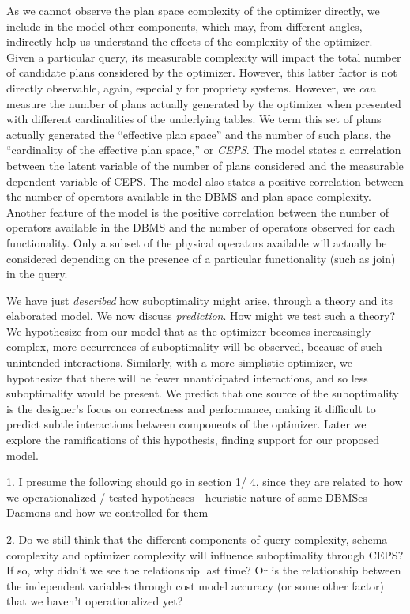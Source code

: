As we cannot observe the plan space complexity of the optimizer
directly, we include in the model other components, which may, from
different angles, indirectly help us understand the effects of the
complexity of the optimizer. Given a particular query, its measurable
complexity will impact the total number of candidate plans considered
by the optimizer. However, this latter factor is not directly
observable, again, especially for propriety systems. However, we {\em
can} measure the number of plans actually generated by the optimizer
when presented with different
cardinalities of the underlying tables. We term this set of plans
actually generated the
``effective plan space'' and the number of such plans, the
``cardinality of the effective plan
space,'' or {\em CEPS}. The model states a correlation between the
latent variable of the number
of plans considered and the measurable dependent variable of CEPS. The
model also states a
positive correlation between the number of operators available in the
DBMS and plan space
complexity. Another feature of the model is the positive correlation
between the number of
operators available in the DBMS and the number of operators observed
for each functionality. Only a subset of the physical operators
available will actually be considered depending on the
presence of a particular functionality (such as join) in the query.

We have just {\em described} how suboptimality might arise, through a
theory and its elaborated
model. We now discuss {\em prediction}.
How might we test such a theory? We hypothesize from our model that as
the optimizer becomes increasingly complex, more occurrences of
suboptimality will be observed, because of such unintended
interactions. Similarly, with a more simplistic optimizer, we
hypothesize that there will be fewer unanticipated interactions, and
so less suboptimality would be present. We predict that one source of
the suboptimality is the designer's focus on correctness and
performance, making it difficult to predict subtle interactions
between components of the optimizer. Later we explore the
ramifications of this hypothesis, finding support for our proposed
model.

1. I presume the following should go in section 1/ 4, since they are
related to how we
operationalized / tested hypotheses
- heuristic nature of some DBMSes
- Daemons and how we controlled for them

2. Do we still think that the different components of query
complexity, schema complexity and
optimizer complexity will influence suboptimality through CEPS? If so,
why didn't we see the
relationship last time? Or is the relationship between the independent
variables through cost
model accuracy (or some other factor) that we haven't operationalized yet?

